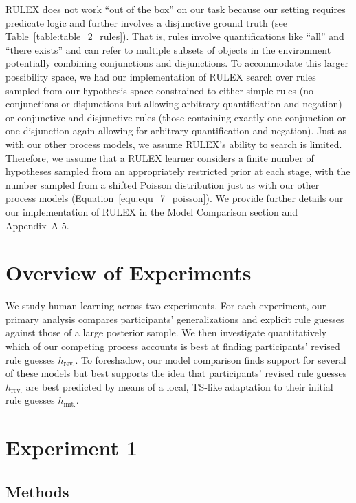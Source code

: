 \documentclass[doc,natbib,floatsintext]{apa7}
\newcommand{\hr}{h_{\mathrm{rev.}}}
\newcommand{\hi}{h_{\mathrm{init.}}}
\begin{document}
RULEX does not work ``out of the box'' on our task because our setting requires predicate logic and further involves a disjunctive ground truth (see Table~\ref{table:table_2_rules}). That is, rules involve quantifications like ``all'' and ``there exists'' and can refer to multiple subsets of objects in the environment potentially combining conjunctions and disjunctions. To accommodate this larger possibility space, we had our implementation of RULEX search over rules sampled from our hypothesis space constrained to either simple rules (no conjunctions or disjunctions but allowing arbitrary quantification and negation) or conjunctive and disjunctive rules (those containing exactly one conjunction or one disjunction again allowing for arbitrary quantification and negation). Just as with our other process models, we assume RULEX's ability to search is limited. Therefore, we assume that a RULEX learner considers a finite number of hypotheses sampled from an appropriately restricted prior at each stage, with the number sampled from a shifted Poisson distribution just as with our other process models (Equation~\ref{equ:equ_7_poisson}). We provide further details our our implementation of RULEX in the Model Comparison section and Appendix~A-5. 

\section{Overview of Experiments}
We study human learning across two experiments. For each experiment, our primary analysis compares participants' generalizations and explicit rule guesses against those of a large posterior sample. We then investigate quantitatively which of our competing process accounts is best at finding participants' revised rule guesses $\hr$. To foreshadow, our model comparison finds support for several of these models but best supports the idea that participants' revised rule guesses $\hr$ are best predicted by means of a local, TS-like adaptation to their initial rule guesses $\hi$.

\section{Experiment 1}
\subsection{Methods}
\end{document}
